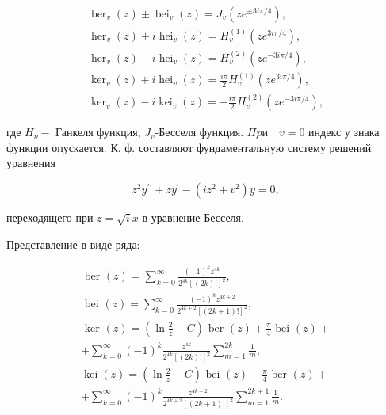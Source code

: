 \documentclass[10pt]{article}
\begin{document}
\[

\begin{gathered}

\operatorname{ber}_{v}(z) \pm \operatorname{bei}_{v}(z)=J_{v}\left(z e^{ \pm 3 i \pi / 4}\right), \\

\operatorname{her}_{v}(z)+i \operatorname{hei}_{v}(z)=H_{v}^{(1)}\left(z e^{3 i \pi / 4}\right), \\

\operatorname{her}_{v}(z)-i \operatorname{hei}_{v}(z)=H_{v}^{(2)}\left(z e^{-3 i \pi / 4}\right), \\

\operatorname{ker}_{v}(z)+i \operatorname{hei}_{v}(z)=\frac{i \pi}{2} H_{v}^{(1)}\left(z e^{3 i \pi / 4}\right), \\

\operatorname{ker}_{v}(z)-i \operatorname{kei}_{v}(z)=-\frac{i \pi}{2} H_{v}^{(2)}\left(z e^{-3 i \pi / 4}\right),

\end{gathered}

\]



где $H_{\nu}-$ Ганкеля функция, $J_{v}$-Бесселя функция. $\Pi p и \quad v=0$ индекс у знака функции опускается. К. ф. составляют фундаментальную систему решений уравнения



\[

z^{2} y^{\prime \prime}+z y^{\prime}-\left(i z^{2}+v^{2}\right) y=0,

\]



переходящего при $z=\sqrt{i} x$ в уравнение Бесселя.



Представление в виде ряда:



\[

\begin{gathered}

\text { ber }(z)=\sum_{k=0}^{\infty} \frac{(-1)^{k} z^{4 k}}{2^{4 k}[(2 k) !]^{2}}, \\

\text { bei }(z)=\sum_{k=0}^{\infty} \frac{(-1)^{k} z^{4 k+2}}{2^{4 k+2}[(2 k+1) !]^{2}}, \\

\text { ker }(z)=\left(\ln \frac{2}{z}-C\right) \text { ber }(z)+\frac{\pi}{4} \text { bei }(z)+ \\

+\sum_{k=0}^{\infty}(-1)^{k} \frac{z^{4 k}}{2^{4 k}[(2 k) !]^{2}} \sum_{m=1}^{2 k} \frac{1}{m}, \\

\operatorname{kei}(z)=\left(\ln \frac{2}{z}-C\right) \text { bei }(z)-\frac{\pi}{4} \text { ber }(z)+ \\

+\sum_{k=0}^{\infty}(-1)^{k} \frac{z^{4 k+2}}{2^{4 k+2}[(2 k+1) !]^{2}} \sum_{m=1}^{2 k+1} \frac{1}{m} .

\end{gathered}

\]
\end{document}
